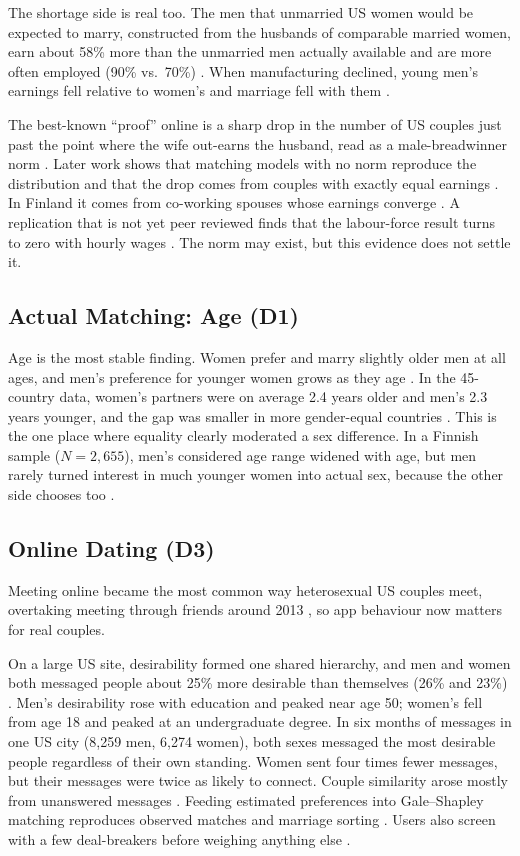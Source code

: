 \documentclass[conference,a4paper]{IEEEtran}
\begin{document}
The shortage side is real too. The men that unmarried US women would be expected to marry, constructed from the husbands of comparable married women, earn about 58\% more than the unmarried men actually available and are more often employed (90\% vs.\ 70\%) \cite{lichter2020}. When manufacturing declined, young men's earnings fell relative to women's and marriage fell with them \cite{autor2019}.

The best-known ``proof'' online is a sharp drop in the number of US couples just past the point where the wife out-earns the husband, read as a male-breadwinner norm \cite{bertrand2015}. Later work shows that matching models with no norm reproduce the distribution and that the drop comes from couples with exactly equal earnings \cite{binder2022}. In Finland it comes from co-working spouses whose earnings converge \cite{zinovyeva2021}. A replication that is not yet peer reviewed finds that the labour-force result turns to zero with hourly wages \cite{rosenberg2024}. The norm may exist, but this evidence does not settle it.

\subsection{Actual Matching: Age (D1)}
Age is the most stable finding. Women prefer and marry slightly older men at all ages, and men's preference for younger women grows as they age \cite{kenrick1992}. In the 45-country data, women's partners were on average 2.4 years older and men's 2.3 years younger, and the gap was smaller in more gender-equal countries \cite{walter2020}. This is the one place where equality clearly moderated a sex difference. In a Finnish sample ($N=2{,}655$), men's considered age range widened with age, but men rarely turned interest in much younger women into actual sex, because the other side chooses too \cite{antfolk2017}.

\subsection{Online Dating (D3)}
Meeting online became the most common way heterosexual US couples meet, overtaking meeting through friends around 2013 \cite{rosenfeld2019}, so app behaviour now matters for real couples.

On a large US site, desirability formed one shared hierarchy, and men and women both messaged people about 25\% more desirable than themselves (26\% and 23\%) \cite{bruch2018}. Men's desirability rose with education and peaked near age 50; women's fell from age 18 and peaked at an undergraduate degree. In six months of messages in one US city (8,259 men, 6,274 women), both sexes messaged the most desirable people regardless of their own standing. Women sent four times fewer messages, but their messages were twice as likely to connect. Couple similarity arose mostly from unanswered messages \cite{kreager2014}. Feeding estimated preferences into Gale--Shapley matching \cite{gale1962} reproduces observed matches and marriage sorting \cite{hitsch2010aer}. Users also screen with a few deal-breakers before weighing anything else \cite{bruch2016}.
\end{document}
